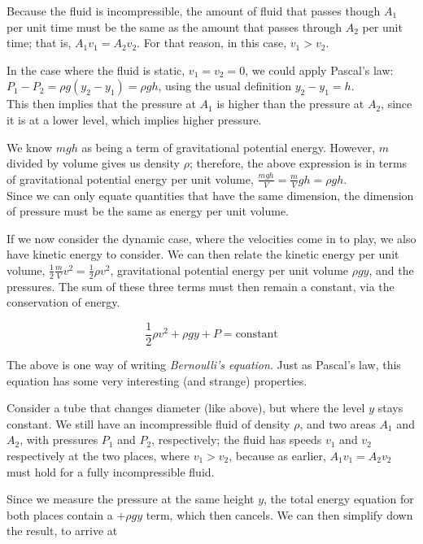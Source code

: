 Because the fluid is incompressible, the amount of fluid that passes though $A_1$ per unit time must be the same as the amount that passes through $A_2$ per unit time; that is, $A_1 v_1 = A_2 v_2$. For that reason, in this case, $v_1 > v_2$.

In the case where the fluid is static, $v_1 = v_2 = 0$, we could apply Pascal's law: $P_1 - P_2 = \rho g (y_2 - y_1) = \rho g h$, using the usual definition $y_2 - y_1 = h$.\\
This then implies that the pressure at $A_1$ is higher than the pressure at $A_2$, since it is at a lower level, which implies higher pressure.

We know $m g h$ as being a term of gravitational potential energy. However, $m$ divided by volume gives us density $\rho$; therefore, the above expression is in terms of gravitational potential energy per unit volume, $\displaystyle \frac{m g h}{V} = \frac{m}{V} g h = \rho g h$.\\
Since we can only equate quantities that have the same dimension, the dimension of pressure must be the same as energy per unit volume.

If we now consider the dynamic case, where the velocities come in to play, we also have kinetic energy to consider. We can then relate the kinetic energy per unit volume, $\displaystyle \frac{1}{2} \frac{m}{V} v^2 = \frac{1}{2} \rho v^2$, gravitational potential energy per unit volume $\rho g y$, and the pressures. The sum of these three terms must then remain a constant, via the conservation of energy.

\begin{equation}
\frac{1}{2} \rho v^2 + \rho g y + P = \text{constant}
\end{equation}

The above is one way of writing \emph{Bernoulli's equation}. Just as Pascal's law, this equation has some very interesting (and strange) properties.

Consider a tube that changes diameter (like above), but where the level $y$ stays constant. We still have an incompressible fluid of density $\rho$, and two areas $A_1$ and $A_2$, with pressures $P_1$ and $P_2$, respectively; the fluid has speeds $v_1$ and $v_2$ respectively at the two places, where $v_1 > v_2$, because as earlier, $A_1 v_1 = A_2 v_2$ must hold for a fully incompressible fluid.

Since we measure the pressure at the same height $y$, the total energy equation for both places contain a $+ \rho g y$ term, which then cancels. We can then simplify down the result, to arrive at

